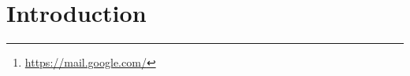 \documentclass[a4paper,11pt]{report}
\begin{document}
\begin{abstract}
  In a second part, we focused our attention on concrete applications of CSRF vulnerabilities. 
  Lots of companies were affected in the past and we decided to deal with Google well-known 
  stories about CSRF. Indeed, 2 different vulnerabilities were discovered in 2007 concerning 
  Gmail \footnote{\url{https://mail.google.com/}} email service.
  
  Finally, we implemented a small webapp with different services, either vulnerable or protected 
  from CSRF attack. This webapp associated with an attacker website, both developped from scratch, 
  outline different practical examples of the attack and different ways to prevent it.
  \end{abstract}
  

\tableofcontents{} %
\clearpage %
\setcounter{page}{1} %

  

  \section{Introduction}
  
\end{document}
